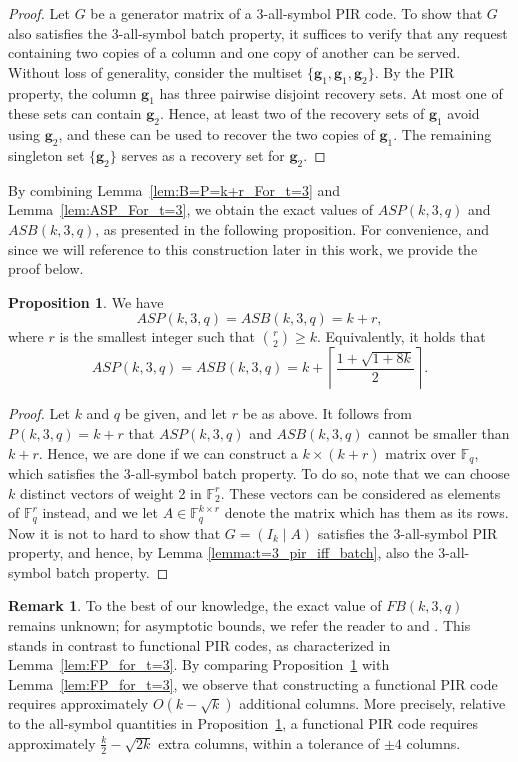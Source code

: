 \documentclass[11pt,a4paper]{article}
\theoremstyle{definition}
\newtheorem{proposition}[theorem]{Proposition}
\newtheorem{remark}[theorem]{Remark}
\newcommand{\bfg}{{\boldsymbol g}}
\newcommand{\F}{\mathbb{F}}
\begin{document}
\begin{proof}
    Let $G$ be a generator matrix of a $3$-all-symbol PIR code. To show that $G$ also satisfies the $3$-all-symbol batch property, it suffices to verify that any request containing two copies of a column and one copy of another can be served. Without loss of generality, consider the multiset \(\{\bfg_1, \bfg_1, \bfg_2\}\). By the PIR property, the column \(\bfg_1\) has three pairwise disjoint recovery sets. At most one of these sets can contain \(\bfg_2\). Hence, at least two of the recovery sets of \(\bfg_1\) avoid using \(\bfg_2\), and these can be used to recover the two copies of \(\bfg_1\).
The remaining singleton set \(\{\bfg_2\}\) serves as a recovery set for \(\bfg_2\).
\end{proof}

By combining Lemma~\ref{lem:B=P=k+r_For_t=3} and Lemma~\ref{lem:ASP_For_t=3}, we obtain the exact values of $ASP(k,3,q)$ and $ASB(k,3,q)$, as presented in the following proposition. For convenience, and since we will reference to this construction later in this work, we provide the proof below.
\begin{proposition}\label{prop:t=3}
    We have
    $$
        ASP(k,3,q) = ASB(k,3,q) = k + r,
    $$
    where $r$ is the smallest integer such that $\binom{r}{2} \geq k$. Equivalently, it holds that
    $$
        ASP(k,3,q) = ASB(k,3,q) = k + \left\lceil \frac{1 + \sqrt{1 + 8k}}{2}\right\rceil.
    $$
\end{proposition}

\begin{proof}
    Let $k$ and $q$ be given, and let $r$ be as above. It follows from $P(k,3,q) = k+r$ that $ASP(k,3,q)$ and $ASB(k,3,q)$ cannot be smaller than $k+r$. Hence, we are done if we can construct a $k\times (k+r)$ matrix over $\F_q$, which satisfies the $3$-all-symbol batch property. To do so, note that we can choose $k$ distinct vectors of weight 2 in $\F_2^{r}$. These vectors can be considered as elements of $\F_q^{r}$ instead, and we let $A\in \F_q^{k\times r}$ denote the matrix which has them as its rows. Now it is not to hard to show that $G = (I_k \mid A)$ satisfies the $3$-all-symbol PIR property, and hence, by Lemma \ref{lemma:t=3_pir_iff_batch}, also the $3$-all-symbol batch property. 
\end{proof}


\begin{remark}
    To the best of our knowledge, the exact value of 
    $FB(k,3,q)$ remains unknown; for asymptotic bounds, 
    we refer the reader to \cite[Table~IV]{FAZELI2015} 
    and \cite{KILIC2025}. This stands in contrast to 
    functional PIR codes, as characterized in 
    Lemma~\ref{lem:FP_for_t=3}. By comparing 
    Proposition~\ref{prop:t=3} with 
    Lemma~\ref{lem:FP_for_t=3}, we observe that 
    constructing a functional PIR code requires 
    approximately $O(k-\sqrt{k})$ additional columns. 
    More precisely, relative to the all-symbol 
    quantities in Proposition~\ref{prop:t=3}, a 
    functional PIR code requires approximately 
    $\frac{k}{2} - \sqrt{2k}$ extra columns, 
    within a tolerance of $\pm 4$ columns.
\end{remark}
\end{document}
